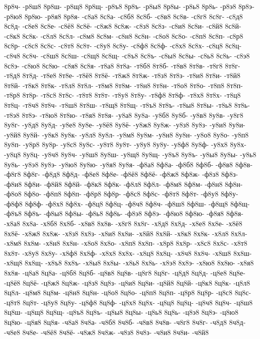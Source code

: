 {8р8ч-
-р8ш8
8р8ш-
-р8щ8
8р8щ-
-р8ъ8
8р8ъ-
-р8ы8
8р8ы-
-р8ь8
8р8ь-
-р8э8
8р8э-
-р8ю8
8р8ю-
-р8я8
8р8я-
-с8а8
8с8а-
-с8б8
8с8б-
-с8в8
8с8в-
-с8г8
8с8г-
-с8д8
8с8д-
-с8е8
8с8е-
-с8ё8
8с8ё-
-с8ж8
8с8ж-
-с8з8
8с8з-
-с8и8
8с8и-
-с8й8
8с8й-
-с8к8
8с8к-
-с8л8
8с8л-
-с8м8
8с8м-
-с8н8
8с8н-
-с8о8
8с8о-
-с8п8
8с8п-
-с8р8
8с8р-
-с8с8
8с8с-
-с8т8
8с8т-
-с8у8
8с8у-
-с8ф8
8с8ф-
-с8х8
8с8х-
-с8ц8
8с8ц-
-с8ч8
8с8ч-
-с8ш8
8с8ш-
-с8щ8
8с8щ-
-с8ъ8
8с8ъ-
-с8ы8
8с8ы-
-с8ь8
8с8ь-
-с8э8
8с8э-
-с8ю8
8с8ю-
-с8я8
8с8я-
-т8а8
8т8а-
-т8б8
8т8б-
-т8в8
8т8в-
-т8г8
8т8г-
-т8д8
8т8д-
-т8е8
8т8е-
-т8ё8
8т8ё-
-т8ж8
8т8ж-
-т8з8
8т8з-
-т8и8
8т8и-
-т8й8
8т8й-
-т8к8
8т8к-
-т8л8
8т8л-
-т8м8
8т8м-
-т8н8
8т8н-
-т8о8
8т8о-
-т8п8
8т8п-
-т8р8
8т8р-
-т8с8
8т8с-
-т8т8
8т8т-
-т8у8
8т8у-
-т8ф8
8т8ф-
-т8х8
8т8х-
-т8ц8
8т8ц-
-т8ч8
8т8ч-
-т8ш8
8т8ш-
-т8щ8
8т8щ-
-т8ъ8
8т8ъ-
-т8ы8
8т8ы-
-т8ь8
8т8ь-
-т8э8
8т8э-
-т8ю8
8т8ю-
-т8я8
8т8я-
-у8а8
8у8а-
-у8б8
8у8б-
-у8в8
8у8в-
-у8г8
8у8г-
-у8д8
8у8д-
-у8е8
8у8е-
-у8ё8
8у8ё-
-у8ж8
8у8ж-
-у8з8
8у8з-
-у8и8
8у8и-
-у8й8
8у8й-
-у8к8
8у8к-
-у8л8
8у8л-
-у8м8
8у8м-
-у8н8
8у8н-
-у8о8
8у8о-
-у8п8
8у8п-
-у8р8
8у8р-
-у8с8
8у8с-
-у8т8
8у8т-
-у8у8
8у8у-
-у8ф8
8у8ф-
-у8х8
8у8х-
-у8ц8
8у8ц-
-у8ч8
8у8ч-
-у8ш8
8у8ш-
-у8щ8
8у8щ-
-у8ъ8
8у8ъ-
-у8ы8
8у8ы-
-у8ь8
8у8ь-
-у8э8
8у8э-
-у8ю8
8у8ю-
-у8я8
8у8я-
-ф8а8
8ф8а-
-ф8б8
8ф8б-
-ф8в8
8ф8в-
-ф8г8
8ф8г-
-ф8д8
8ф8д-
-ф8е8
8ф8е-
-ф8ё8
8ф8ё-
-ф8ж8
8ф8ж-
-ф8з8
8ф8з-
-ф8и8
8ф8и-
-ф8й8
8ф8й-
-ф8к8
8ф8к-
-ф8л8
8ф8л-
-ф8м8
8ф8м-
-ф8н8
8ф8н-
-ф8о8
8ф8о-
-ф8п8
8ф8п-
-ф8р8
8ф8р-
-ф8с8
8ф8с-
-ф8т8
8ф8т-
-ф8у8
8ф8у-
-ф8ф8
8ф8ф-
-ф8х8
8ф8х-
-ф8ц8
8ф8ц-
-ф8ч8
8ф8ч-
-ф8ш8
8ф8ш-
-ф8щ8
8ф8щ-
-ф8ъ8
8ф8ъ-
-ф8ы8
8ф8ы-
-ф8ь8
8ф8ь-
-ф8э8
8ф8э-
-ф8ю8
8ф8ю-
-ф8я8
8ф8я-
-х8а8
8х8а-
-х8б8
8х8б-
-х8в8
8х8в-
-х8г8
8х8г-
-х8д8
8х8д-
-х8е8
8х8е-
-х8ё8
8х8ё-
-х8ж8
8х8ж-
-х8з8
8х8з-
-х8и8
8х8и-
-х8й8
8х8й-
-х8к8
8х8к-
-х8л8
8х8л-
-х8м8
8х8м-
-х8н8
8х8н-
-х8о8
8х8о-
-х8п8
8х8п-
-х8р8
8х8р-
-х8с8
8х8с-
-х8т8
8х8т-
-х8у8
8х8у-
-х8ф8
8х8ф-
-х8х8
8х8х-
-х8ц8
8х8ц-
-х8ч8
8х8ч-
-х8ш8
8х8ш-
-х8щ8
8х8щ-
-х8ъ8
8х8ъ-
-х8ы8
8х8ы-
-х8ь8
8х8ь-
-х8э8
8х8э-
-х8ю8
8х8ю-
-х8я8
8х8я-
-ц8а8
8ц8а-
-ц8б8
8ц8б-
-ц8в8
8ц8в-
-ц8г8
8ц8г-
-ц8д8
8ц8д-
-ц8е8
8ц8е-
-ц8ё8
8ц8ё-
-ц8ж8
8ц8ж-
-ц8з8
8ц8з-
-ц8и8
8ц8и-
-ц8й8
8ц8й-
-ц8к8
8ц8к-
-ц8л8
8ц8л-
-ц8м8
8ц8м-
-ц8н8
8ц8н-
-ц8о8
8ц8о-
-ц8п8
8ц8п-
-ц8р8
8ц8р-
-ц8с8
8ц8с-
-ц8т8
8ц8т-
-ц8у8
8ц8у-
-ц8ф8
8ц8ф-
-ц8х8
8ц8х-
-ц8ц8
8ц8ц-
-ц8ч8
8ц8ч-
-ц8ш8
8ц8ш-
-ц8щ8
8ц8щ-
-ц8ъ8
8ц8ъ-
-ц8ы8
8ц8ы-
-ц8ь8
8ц8ь-
-ц8э8
8ц8э-
-ц8ю8
8ц8ю-
-ц8я8
8ц8я-
-ч8а8
8ч8а-
-ч8б8
8ч8б-
-ч8в8
8ч8в-
-ч8г8
8ч8г-
-ч8д8
8ч8д-
-ч8е8
8ч8е-
-ч8ё8
8ч8ё-
-ч8ж8
8ч8ж-
-ч8з8
8ч8з-
-ч8и8
8ч8и-
-ч8й8
}
